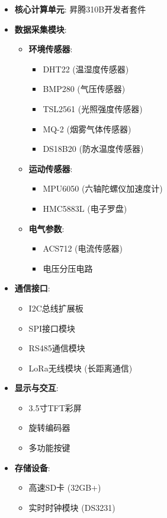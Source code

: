 \begin{itemize}
\tightlist
\item
  \textbf{核心计算单元}: 昇腾310B开发者套件
\item
  \textbf{数据采集模块}:

  \begin{itemize}
  \tightlist
  \item
    \textbf{环境传感器}:

    \begin{itemize}
    \tightlist
    \item
      DHT22 (温湿度传感器)
    \item
      BMP280 (气压传感器)
    \item
      TSL2561 (光照强度传感器)
    \item
      MQ-2 (烟雾气体传感器)
    \item
      DS18B20 (防水温度传感器)
    \end{itemize}
  \item
    \textbf{运动传感器}:

    \begin{itemize}
    \tightlist
    \item
      MPU6050 (六轴陀螺仪加速度计)
    \item
      HMC5883L (电子罗盘)
    \end{itemize}
  \item
    \textbf{电气参数}:

    \begin{itemize}
    \tightlist
    \item
      ACS712 (电流传感器)
    \item
      电压分压电路
    \end{itemize}
  \end{itemize}
\item
  \textbf{通信接口}:

  \begin{itemize}
  \tightlist
  \item
    I2C总线扩展板
  \item
    SPI接口模块
  \item
    RS485通信模块
  \item
    LoRa无线模块 (长距离通信)
  \end{itemize}
\item
  \textbf{显示与交互}:

  \begin{itemize}
  \tightlist
  \item
    3.5寸TFT彩屏
  \item
    旋转编码器
  \item
    多功能按键
  \end{itemize}
\item
  \textbf{存储设备}:

  \begin{itemize}
  \tightlist
  \item
    高速SD卡 (32GB+)
  \item
    实时时钟模块 (DS3231)
  \end{itemize}
\end{itemize}

